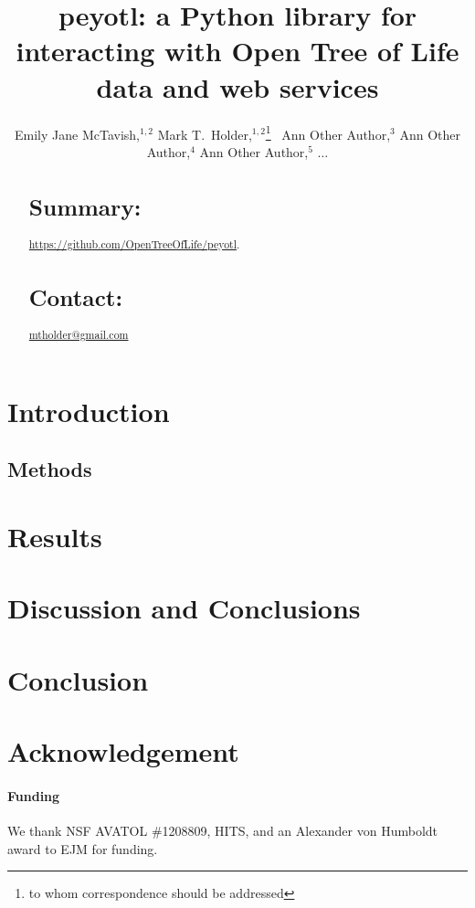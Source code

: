 \documentclass{bioinfo}
\begin{document}
\title[peyotl python package]{peyotl: a Python library for interacting with Open Tree of Life data and web services}

\author[McTavish\textit{et~al}]{
    Emily Jane McTavish,$^{1,2}$
    Mark T.~Holder,$^{1,2}$\footnote{to whom correspondence should be addressed}~
    Ann Other Author,$^{3}$
    Ann Other Author,$^{4}$
    Ann Other Author,$^{5}$ $\ldots$
}
\address{$^{1}$Department of Ecology and Evolutionary Biology, University of Kansas, Lawrence KS, USA\\
$^{2}$Heidelberg Institute of Theoretical Studies, Heidelberg, Germany}



\maketitle

\begin{abstract}
\section{Summary:}
\url{https://github.com/OpenTreeOfLife/peyotl}.
\section{Contact:} \href{mailto:mtholder@gmail.com}{mtholder@gmail.com}
\end{abstract}

\section{Introduction}
\begin{methods}
\section{Methods}
\end{methods}
\section{Results}

\section{Discussion and Conclusions}

\section{Conclusion}

\section*{Acknowledgement}

\paragraph{Funding\textcolon} We thank NSF AVATOL \#1208809, HITS, and an Alexander von Humboldt award to EJM for funding.

\end{document}

